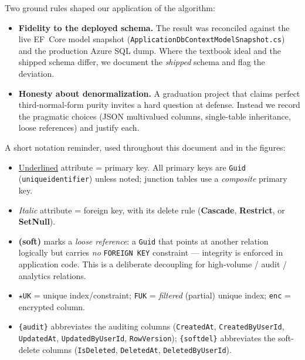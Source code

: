 \documentclass[11pt,a4paper]{article}
\begin{document}
Two ground rules shaped our application of the algorithm:

\begin{itemize}[leftmargin=1.4em]
  \item \textbf{Fidelity to the deployed schema.} The result was reconciled
        against the live EF~Core model snapshot
        (\texttt{ApplicationDbContextModelSnapshot.cs}) and the production Azure
        SQL dump. Where the textbook ideal and the shipped schema differ, we
        document the \emph{shipped} schema and flag the deviation.
  \item \textbf{Honesty about denormalization.} A graduation project that
        claims perfect third-normal-form purity invites a hard question at
        defense. Instead we record the pragmatic choices (JSON multivalued
        columns, single-table inheritance, loose references) and justify each.
\end{itemize}

A short notation reminder, used throughout this document and in the figures:

\begin{itemize}[leftmargin=1.4em]
  \item \underline{Underlined} attribute = primary key. All primary keys are
        \texttt{Guid} (\texttt{uniqueidentifier}) unless noted; junction tables
        use a \emph{composite} primary key.
  \item \emph{Italic} attribute = foreign key, with its delete rule
        (\textbf{Cascade}, \textbf{Restrict}, or \textbf{SetNull}).
  \item \textbf{(soft)} marks a \emph{loose reference}: a \texttt{Guid} that
        points at another relation logically but carries \emph{no}
        \texttt{FOREIGN KEY} constraint --- integrity is enforced in
        application code. This is a deliberate decoupling for
        high-volume / audit / analytics relations.
  \item \texttt{$\star$UK} = unique index/constraint;
        \texttt{FUK} = \emph{filtered} (partial) unique index;
        \texttt{enc} = encrypted column.
  \item \texttt{\{audit\}} abbreviates the auditing columns
        (\texttt{CreatedAt}, \texttt{CreatedByUserId}, \texttt{UpdatedAt},
        \texttt{UpdatedByUserId}, \texttt{RowVersion}); \texttt{\{softdel\}}
        abbreviates the soft-delete columns
        (\texttt{IsDeleted}, \texttt{DeletedAt}, \texttt{DeletedByUserId}).
\end{itemize}
\end{document}
